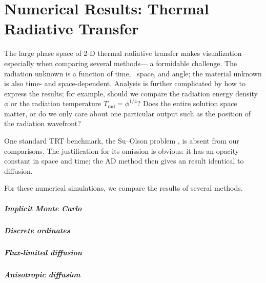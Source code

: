 
\chapter{Numerical Results: Thermal Radiative Transfer}
\label{chap:trtNumericalResults}

The large phase space of 2-D thermal radiative transfer makes visualization---%
especially when comparing several methods---%
a formidable challenge. The radiation unknown is a function of time, \xy\
space, and angle; the material unknown is also time- and space-dependent.
Analysis is further complicated by how to express the results; for example,
should we compare the radiation energy density $\phi$ or
the radiation temperature $T_\text{rad}=\phi^{1/4}$? Does the entire solution
space matter, or do we only care about one particular output such as the
position of the radiation wavefront?


One standard TRT benchmark, the Su--Olson problem \cite{Su1997}, is absent from
our comparisons. The justification for its omission is obvious: it has an
opacity constant in space and time; the AD method then gives an result identical
to diffusion.

For these numerical simulations, we compare the results of several methods.

\paragraph{Implicit Monte Carlo}

\paragraph{Discrete ordinates}

\paragraph{Flux-limited diffusion}

\paragraph{Anisotropic diffusion}

